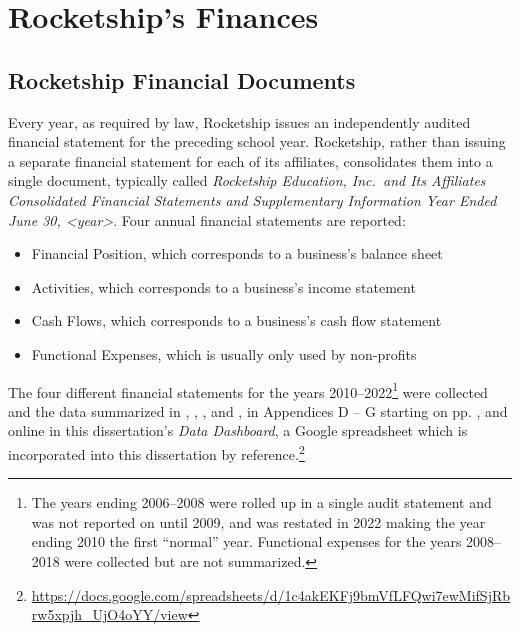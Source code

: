 \section{Rocketship's Finances}
\label{sec:rocketship_finance}\indent%

\subsection{Rocketship Financial Documents}%
\label{sec:rocketship-financial-docs}\indent%

Every year, as required by law, Rocketship issues an independently audited financial statement for the preceding school year. Rocketship, rather than issuing a separate financial statement for each of its affiliates, consolidates them into a single document, typically called \textit{Rocketship Education, Inc.\ and Its Affiliates Consolidated Financial Statements and Supplementary Information Year Ended June 30, <year>}. Four annual financial statements are reported:
\begin{itemize}
  \item Financial Position, which corresponds to a business's balance sheet
  \item Activities, which corresponds to a business's income statement
  \item Cash Flows, which corresponds to a business's cash flow statement
  \item Functional Expenses, which is usually only used by non-profits
\end{itemize}

The four different financial statements for the years 2010–2022\footnote{The years ending 2006–2008 were rolled up in a single audit statement and was not reported on until 2009, and was restated in 2022 making the year ending 2010 the first ``normal'' year. Functional expenses for the years 2008–2018 were collected but are not summarized.} were collected and the data summarized in , , , and , in Appendices D – G starting on pp. \pageref{tab:consolidated_financial_position}, and online in this dissertation's \textit{Data Dashboard}, a Google spreadsheet which is incorporated into this dissertation by reference.\footnote{\url{https://docs.google.com/spreadsheets/d/1c4akEKFj9bmVfLFQwi7ewMifSjRbrw5xpjh_UjO4oYY/view}} 


